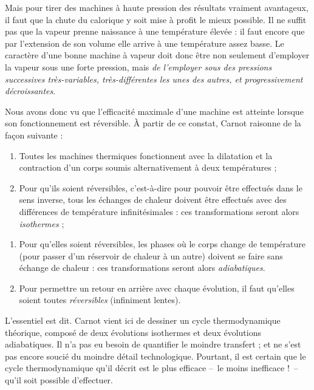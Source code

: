 			Mais pour tirer des machines à haute pression des résultats vraiment avantageux, il faut que la chute du calorique y soit mise à profit le mieux possible. Il ne suffit pas que la vapeur prenne naissance à une température élevée : il faut encore que par l’extension de son volume elle arrive à une température assez basse. Le caractère d’une bonne machine à vapeur doit donc être non seulement d’employer la vapeur sous une forte pression, mais \emph{de l’employer sous des pressions successives très-variables, très-différentes les unes des autres, et progressivement décroissantes}.
		
		Nous avons donc vu que l’efficacité maximale d’une machine est atteinte lorsque son fonctionnement est réversible. À partir de ce constat, Carnot raisonne de la façon suivante :

		\begin{enumerate}
			\item Toutes les machines thermiques fonctionnent avec la dilatation et la contraction d’un corps soumis alternativement à deux températures ;
			\item Pour qu’ils soient réversibles, c’est-à-dire pour pouvoir être effectués dans le sens inverse, tous les échanges de chaleur doivent être effectués avec des différences de température infinitésimales : ces transformations seront alors \emph{isothermes} ;
		\end{enumerate}\vspace{-0.7em}%
		
		\begin{enumerate}%
			\item Pour qu’elles soient réversibles, les phases où le corps change de température (pour passer d’un réservoir de chaleur à un autre) doivent se faire sans échange de chaleur : ces transformations seront alors \emph{adiabatiques}.
			\item Pour permettre un retour en arrière avec chaque évolution, il faut qu’elles soient toutes \emph{réversibles} (infiniment lentes).
		\end{enumerate}

		L’essentiel est dit. Carnot vient ici de dessiner un cycle thermodynamique théorique, composé de deux évolutions isothermes et deux évolutions adiabatiques. Il n’a pas eu besoin de quantifier le moindre transfert ; et ne s’est pas encore soucié du moindre détail technologique. Pourtant, il est certain que le cycle thermodynamique qu’il décrit est le plus efficace --\ le moins inefficace !\ -- qu’il soit possible d’effectuer.
		 

